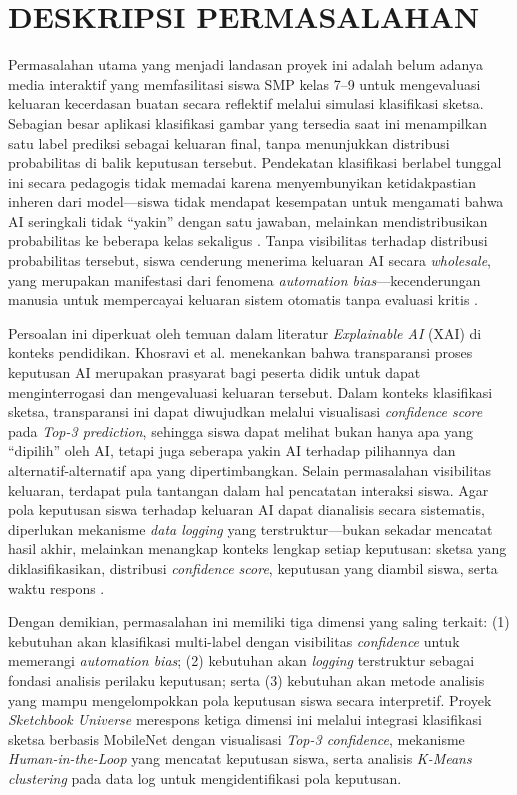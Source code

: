 \documentclass[12pt,a4paper,oneside,openany]{report}
\begin{document}
\section{DESKRIPSI PERMASALAHAN}
\label{sec:deskripsi-permasalahan}

Permasalahan utama yang menjadi landasan proyek ini adalah belum adanya media interaktif yang memfasilitasi siswa SMP kelas 7--9 untuk mengevaluasi keluaran kecerdasan buatan secara reflektif melalui simulasi klasifikasi sketsa. Sebagian besar aplikasi klasifikasi gambar yang tersedia saat ini menampilkan satu label prediksi sebagai keluaran final, tanpa menunjukkan distribusi probabilitas di balik keputusan tersebut. Pendekatan klasifikasi berlabel tunggal ini secara pedagogis tidak memadai karena menyembunyikan ketidakpastian inheren dari model---siswa tidak mendapat kesempatan untuk mengamati bahwa AI seringkali tidak ``yakin'' dengan satu jawaban, melainkan mendistribusikan probabilitas ke beberapa kelas sekaligus \cite{ref1}. Tanpa visibilitas terhadap distribusi probabilitas tersebut, siswa cenderung menerima keluaran AI secara \textit{wholesale}, yang merupakan manifestasi dari fenomena \textit{automation bias}---kecenderungan manusia untuk mempercayai keluaran sistem otomatis tanpa evaluasi kritis \cite{ref4}.

Persoalan ini diperkuat oleh temuan dalam literatur \textit{Explainable AI} (XAI) di konteks pendidikan. Khosravi et al. \cite{ref3} menekankan bahwa transparansi proses keputusan AI merupakan prasyarat bagi peserta didik untuk dapat menginterrogasi dan mengevaluasi keluaran tersebut. Dalam konteks klasifikasi sketsa, transparansi ini dapat diwujudkan melalui visualisasi \textit{confidence score} pada \textit{Top-3 prediction}, sehingga siswa dapat melihat bukan hanya apa yang ``dipilih'' oleh AI, tetapi juga seberapa yakin AI terhadap pilihannya dan alternatif-alternatif apa yang dipertimbangkan. Selain permasalahan visibilitas keluaran, terdapat pula tantangan dalam hal pencatatan interaksi siswa. Agar pola keputusan siswa terhadap keluaran AI dapat dianalisis secara sistematis, diperlukan mekanisme \textit{data logging} yang terstruktur---bukan sekadar mencatat hasil akhir, melainkan menangkap konteks lengkap setiap keputusan: sketsa yang diklasifikasikan, distribusi \textit{confidence score}, keputusan yang diambil siswa, serta waktu respons \cite{ref5}\cite{ref10}.

Dengan demikian, permasalahan ini memiliki tiga dimensi yang saling terkait: (1) kebutuhan akan klasifikasi multi-label dengan visibilitas \textit{confidence} untuk memerangi \textit{automation bias}; (2) kebutuhan akan \textit{logging} terstruktur sebagai fondasi analisis perilaku keputusan; serta (3) kebutuhan akan metode analisis yang mampu mengelompokkan pola keputusan siswa secara interpretif. Proyek \textit{Sketchbook Universe} merespons ketiga dimensi ini melalui integrasi klasifikasi sketsa berbasis MobileNet dengan visualisasi \textit{Top-3 confidence}, mekanisme \textit{Human-in-the-Loop} yang mencatat keputusan siswa, serta analisis \textit{K-Means clustering} pada data log untuk mengidentifikasi pola keputusan.
\end{document}
